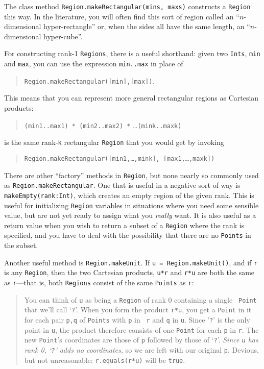 The class method {\tt Region.makeRectangular(mins,
maxs)} constructs a {\tt Region} this way.  In the literature,
you will often find this sort of region called an ``$n$-dimen\-sional
hyper-rectangle'' or, when the sides all have the same length, an
``$n$-dimen\-sional hyper-cube''.

For constructing rank-1 {\tt Regions}, there is a useful shorthand: given two
{\tt Ints}, {\tt min} and {\tt max}, you can use the expression {\tt min..max}
in place of 
\begin{quote}
{\tt Region.makeRectangular([min],[max])}.
\end{quote}
This means that you can represent
more general rectangular regions as Cartesian products: 
\begin{quote}
{\tt (min1..max1) * (min2..max2) *} \ldots {\tt *
(mink..maxk)}
\end{quote}
is the same rank-{\tt k} rectangular {\tt Region} that you would get by invoking
\begin{quote}
{\tt Region.makeRectangular([min1,\ldots,mink], [max1,\ldots,maxk])}
\end{quote}

There are other ``factory'' methods in {\tt Region}, but none nearly so commonly
used as {\tt Region.makeRectangular}.  One that is useful in a negative sort of
way is {\tt make\-Emp\-ty(rank:Int)}, which creates an empty region of the given
rank.  This is useful for initializing {\tt Region} variables in situations
where you need some sensible value, but are not yet ready to assign what you
{\em really} want.  It is also useful as a return value when you wish to return
a subset of a {\tt Region} where the rank is specified, and you have to deal
with the possibility that there are no {\tt Points} in the subset.

Another useful method is {\tt Region.makeUnit}.   If {\tt u =
Region.makeUnit()},  and if {\tt r} is any {\tt Region}, then the two Cartesian
products, {\tt u*r} and {\tt r*u} are both the same  as {\tt r}---that is, both
{\tt Regions} consist of the same {\tt Points} as {\tt r}:
\begin{quote}
You can
think of {\tt u} as being a {\tt Region} of rank 0 containing a single {\tt
Point} that we'll call `{\tt ?}'. When you form the product {\tt r*u}, you get a
{\tt Point} in it for each pair {\tt p,q} of {\tt Points} with {\tt p} in {\tt
r} and {\tt q} in {\tt u}. Since '{\tt ?}' is the only point in {\tt u}, the
product therefore consists of one {\tt Point} for each {\tt p} in {\tt r}.
The new {\tt Point}'s coordinates are those of {\tt p} followed by those of
`{\tt ?}'.  {\em Since {\tt u} has rank 0, `{\tt ?}' adds {\em no}
coordinates,} so we are left with our original {\tt p}. Devious, but not
unreasonable: {\tt r.equals(r*u)} will be {\tt true}.
\end{quote}
  
